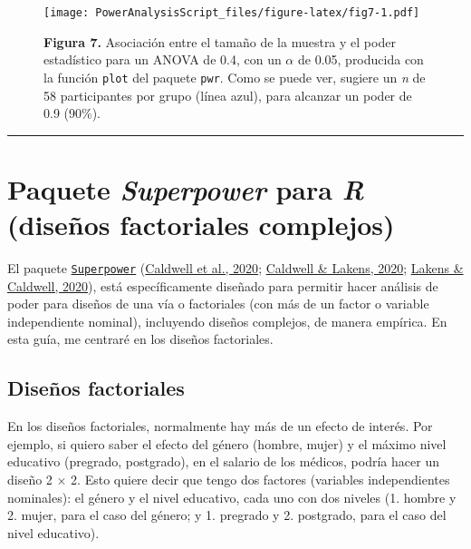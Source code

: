 \documentclass[
]{article}
\begin{document}
\begin{figure}
\centering
\texttt{[image: PowerAnalysisScript\_files/figure-latex/fig7-1.pdf]}
\caption{\textbf{Figura 7.} Asociación entre el tamaño de la muestra y
el poder estadístico para un ANOVA de 0.4, con un \(\alpha\) de 0.05,
producida con la función \texttt{plot} del paquete \texttt{pwr}. Como se
puede ver, sugiere un \emph{n} de 58 participantes por grupo (línea
azul), para alcanzar un poder de 0.9 (90\%).}
\end{figure}

\begin{center}\rule{0.5\linewidth}{0.5pt}\end{center}

\hypertarget{Superpower}{%
\section{\texorpdfstring{Paquete \emph{Superpower} para \emph{R}
(diseños factoriales
complejos)}{Paquete Superpower para R (diseños factoriales complejos)}}\label{Superpower}}

El paquete
\href{https://cran.r-project.org/web/packages/Superpower/vignettes/intro_to_superpower.html}{\texttt{Superpower}}
(\protect\hyperlink{ref-caldwellSuperpowerSimulationBasedPower2020}{Caldwell
et al., 2020};
\protect\hyperlink{ref-caldwellPowerAnalysisSuperpower2020}{Caldwell \&
Lakens, 2020};
\protect\hyperlink{ref-lakensIntroductionSuperpower2020}{Lakens \&
Caldwell, 2020}), está específicamente diseñado para permitir hacer
análisis de poder para diseños de una vía o factoriales (con más de un
factor o variable independiente nominal), incluyendo diseños complejos,
de manera empírica. En esta guía, me centraré en los diseños
factoriales.

\hypertarget{diseuxf1os-factoriales}{%
\subsection{Diseños factoriales}\label{diseuxf1os-factoriales}}

En los diseños factoriales, normalmente hay más de un efecto de interés.
Por ejemplo, si quiero saber el efecto del género (hombre, mujer) y el
máximo nivel educativo (pregrado, postgrado), en el salario de los
médicos, podría hacer un diseño 2 \(\times\) 2. Esto quiere decir que
tengo dos factores (variables independientes nominales): el género y el
nivel educativo, cada uno con dos niveles (1. hombre y 2. mujer, para el
caso del género; y 1. pregrado y 2. postgrado, para el caso del nivel
educativo).
\end{document}
